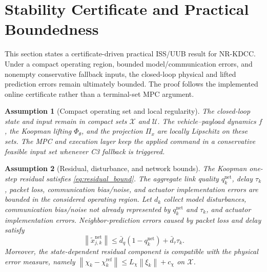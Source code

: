 \documentclass[letterpaper,journal]{IEEEtran}
\newcommand{\Method}{NR-KDCC}
\newcommand{\norm}[1]{\left\lVert #1 \right\rVert}
\newtheorem{assumption}{Assumption}
\begin{document}
\section{Stability Certificate and Practical Boundedness}

This section states a certificate-driven practical ISS/UUB result for \Method{}. Under a compact operating region, bounded model/communication errors, and nonempty conservative fallback inputs, the closed-loop physical and lifted prediction errors remain ultimately bounded. The proof follows the implemented online certificate rather than a terminal-set MPC argument.

\begin{assumption}[Compact operating set and local regularity]
The closed-loop state and input remain in compact sets $\mathcal X$ and $\mathcal U$. The vehicle--payload dynamics $f$, the Koopman lifting $\Phi_\theta$, and the projection $\Pi_x$ are locally Lipschitz on these sets. The MPC and execution layer keep the applied command in a conservative feasible input set whenever C3 fallback is triggered.
\end{assumption}

\begin{assumption}[Residual, disturbance, and network bounds]
The Koopman one-step residual satisfies \eqref{eq:residual_bound}. The aggregate link quality $q_k^{\mathrm{net}}$, delay $\tau_k$, packet loss, communication bias/noise, and actuator implementation errors are bounded in the considered operating region. Let $d_k$ collect model disturbances, communication bias/noise not already represented by $q_k^{\mathrm{net}}$ and $\tau_k$, and actuator implementation errors. Neighbor-prediction errors caused by packet loss and delay satisfy
\begin{equation}
\norm{\tilde x_{j,k}^{\mathrm{net}}}\le
\bar d_q(1-q_k^{\mathrm{net}})+\bar d_\tau \tau_k .
\label{eq:network_prediction_error_bound}
\end{equation}
Moreover, the state-dependent residual component is compatible with the physical error measure, namely
$\norm{\chi_k-\chi_k^{\mathrm{ref}}}\le L_\chi\norm{\xi_k}+c_\chi$ on $\mathcal X$.
\end{assumption}
\end{document}
